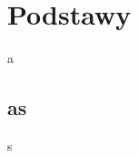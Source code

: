 \documentclass[knowledge.tex]{subfiles}
\begin{document}
    \chapter{Podstawy}
    a
    \newpage
    \section{as}
    s
\end{document}
